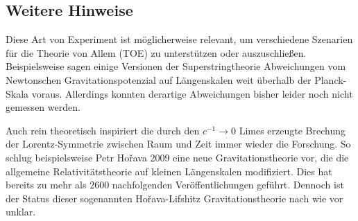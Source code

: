 \subsection*{Weitere Hinweise}

Diese Art von Experiment ist möglicherweise relevant, um verschiedene Szenarien für die Theorie von Allem (TOE) zu unterstützen oder auszuschließen. Beispielsweise sagen einige Versionen der Superstringtheorie Abweichungen vom Newtonschen Gravitationspotenzial auf Längenskalen weit überhalb der Planck-Skala voraus. Allerdings konnten derartige Abweichungen bisher leider noch nicht gemessen werden.

Auch rein theoretisch inspiriert die durch den $c^{−1}\rightarrow 0$ Limes erzeugte Brechung der Lorentz-Symmetrie zwischen Raum und Zeit immer wieder die Forschung. So schlug beispielsweise Petr Hořava 2009 eine neue Gravitationstheorie vor, die die allgemeine Relativitätstheorie auf kleinen Längenskalen modifiziert. Dies hat bereits zu mehr als \num{2600} nachfolgenden Veröffentlichungen geführt. Dennoch ist der Status dieser sogenannten Hořava-Lifshitz Gravitationstheorie nach wie vor unklar.

